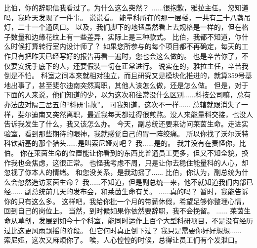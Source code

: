 \documentclass[openany]{book}
\begin{document}
\begin{dialogue}
     比伯，你的辞职信我看过了。为什么这么突然？
     ......很抱歉，雅拉主任。
     您知道吗，我昨天发现了一件事。
     说说看。
     能量科所在的那一层楼，一共有三十八盏吊灯，二十一个通风口。
     以及，我们脚下的地毯虽然看上去规格是一样的，但在格子数量和边缘花纹上有一些差异，实际上是三种款式。
     比伯，我都不知道，你什么时候打算转行室内设计师了？
     如果您所参与的每个项目都不再确定，每天的工作只有把昨天已经写好的报告再看一遍时，您也会这么做的。
     也是辛苦你了，不仅要安抚手底下的人，还要假装一切在正常进行。
     说实在的，雅拉主任，辛苦我倒是不怕。
     科室之间本来就相对独立，而且研究又是模块化推进的，就算359号基地出事了，甚至斐尔迪南突然离职，其他人该怎么做，还是怎么做。
     但是，对于下面的人来说，他们知道的少，以为这次和往常没什么区别......科技公司嘛，总有办法应对隔三岔五的“科研事故”。
     可我知道，这次不一样......
     总辖就跟消失了一样，斐尔迪南又突然离职，最近我每天都过得很煎熬。没人来能量科交接，也没人告诉我发生了什么，我又该怎么办。
     今天，副总统还要来访问莱茵生命。走进实验室，看到那些期待的眼神，我就感觉自己的胃一阵绞痛。
     所以你找了沃尔沃特科钦斯基的那个猎头......是叫索尼娅对吧？
     我......是的。
     我并没有在责怪你，比伯。
     你在莱茵生命的位置能让你看到的东西比普通员工更多，但又不知全貌，换作我也会焦虑，这很正常。
     也怪我考虑不周，只是让你去稳住能量科的人心，却忽视了你本人的情绪。
     和您没关系，是我动摇了......
     比伯，你认为，副总统为什么会忽然造访莱茵生命？
     我......不知道，但是副总统一来，他不就知道我们内部已经......
     副总统前几天的发布会，和莱茵生命有关。
     ......真的吗？
     暂时，我能告诉你的只有这么多。
     这样吧，我给你批一个月的带薪休假，希望足够你整理心情，回到自己的岗位上。
     当然，到时候如果你依然要辞职，我不会挽留。
     ......
     莱茵生命从草创，发展到如今十个科室，能同时运作上百个大型科研项目，不是没有经历过比这更风雨飘摇的阶段。
     但它何时真正倒下过？
     我只是需要你好好想想......
    \\
     索尼娅，这次又麻烦你了。
     唉，人心惶惶的时候，总得让员工们有个发泄口。

\end{dialogue}
\end{document}
